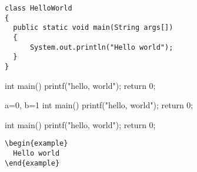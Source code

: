\documentclass{minimal}
\begin{document}
\begin{verbatim}
class HelloWorld
{
  public static void main(String args[])
  {
      System.out.println("Hello world");
  }
}
\end{verbatim}

\begin{cppcode}
int main() {
  printf("hello, world");
  return 0;
}
\end{cppcode}

\begin{cppcode*}{a=0,
	 b=1}
int main() {
  printf("hello, world");
  return 0;
}
\end{cppcode*}

\begin{cppcode_test}
int main() {
  printf("hello, world");
  return 0;
}
\end{cppcode_test}

\begin{verbatim}
\begin{example}
  Hello world
\end{example}
\end{verbatim}
\end{document}
